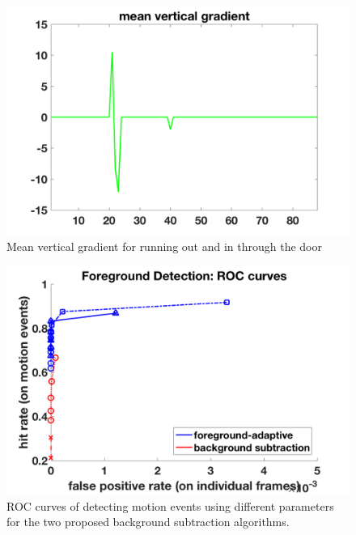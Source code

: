 \documentclass[12pt,oneside]{article} %
\begin{document}
\begin{figure}[htb]
\centering
\includegraphics[scale=0.52]{images/runoutandin.png}
\caption{Mean vertical gradient for running out and in through the door}
\label{run}
\end{figure}

\begin{figure}[htb]
\centering
\includegraphics[scale=0.52]{images/roc.png}
\caption{ROC curves of detecting motion events using different parameters for the two proposed
background subtraction algorithms.}
\label{roc}
\end{figure}
\end{document}

